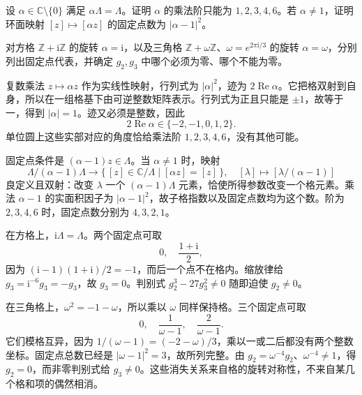 \begin{exercise}[格的旋转与固定点]\label{b3:ex:22-3}
设 \(\alpha\in\mathbb C\setminus\{0\}\) 满足 \(\alpha\Lambda=\Lambda\)。证明 \(\alpha\) 的乘法阶只能为 \(1,2,3,4,6\)。若 \(\alpha\ne1\)，证明环面映射 \([z]\mapsto[\alpha z]\) 的固定点数为 \(|\alpha-1|^2\)。

\ProseParagraphBreak
对方格 \(\mathbb Z+\mathrm{i}\mathbb Z\) 的旋转 \(\alpha=\mathrm{i}\)，以及三角格 \(\mathbb Z+\omega\mathbb Z\)、\(\omega=e^{2\pi\mathrm{i}/3}\) 的旋转 \(\alpha=\omega\)，分别列出固定点代表，并确定 \(g_2,g_3\) 中哪个必须为零、哪个不能为零。
\end{exercise}
\begin{solution}
复数乘法 \(z\mapsto\alpha z\) 作为实线性映射，行列式为 \(|\alpha|^2\)，迹为 \(2\operatorname{Re}\alpha\)。它把格双射到自身，所以在一组格基下由可逆整数矩阵表示。行列式为正且只能是 \(\pm1\)，故等于一，得到 \(|\alpha|=1\)。迹又必须是整数，因此
\[
 2\operatorname{Re}\alpha\in\{-2,-1,0,1,2\}.
\]
单位圆上这些实部对应的角度恰给乘法阶 \(1,2,3,4,6\)，没有其他可能。

固定点条件是 \((\alpha-1)z\in\Lambda\)。当 \(\alpha\ne1\) 时，映射
\[
 \Lambda/(\alpha-1)\Lambda\longrightarrow
 \{\,[z]\in\mathbb C/\Lambda\mid[\alpha z]=[z]\,\},
 \quad[\lambda]\longmapsto[\lambda/(\alpha-1)]
\]
良定义且双射：改变 \(\lambda\) 一个 \((\alpha-1)\Lambda\) 元素，恰使所得参数改变一个格元素。乘法 \(\alpha-1\) 的实面积因子为 \(|\alpha-1|^2\)，故子格指数以及固定点数均为这个数。阶为 \(2,3,4,6\) 时，固定点数分别为 \(4,3,2,1\)。

在方格上，\(\mathrm{i}\Lambda=\Lambda\)。两个固定点可取
\[
 0,\quad\frac{1+\mathrm{i}}2,
\]
因为 \((\mathrm{i}-1)(1+\mathrm{i})/2=-1\)，而后一个点不在格内。缩放律给
\(g_3=\mathrm{i}^{-6}g_3=-g_3\)，故 \(g_3=0\)。判别式 \(g_2^3-27g_3^2\ne0\) 随即迫使 \(g_2\ne0\)。

在三角格上，\(\omega^2=-1-\omega\)，所以乘以 \(\omega\) 同样保持格。三个固定点可取
\[
 0,\quad\frac1{\omega-1},\quad\frac2{\omega-1}.
\]
它们模格互异，因为 \(1/(\omega-1)=(-2-\omega)/3\)，乘以一或二后都没有两个整数坐标。固定点总数已经是 \(|\omega-1|^2=3\)，故所列完整。由
\(g_2=\omega^{-4}g_2\)、\(\omega^{-4}\ne1\)，得 \(g_2=0\)，而非零判别式给 \(g_3\ne0\)。这些消失关系来自格的旋转对称性，不来自某几个格和项的偶然相消。
\end{solution}

